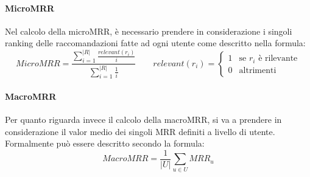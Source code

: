 \paragraph{MicroMRR}
Nel calcolo della microMRR, è necessario prendere in considerazione i singoli ranking delle raccomandazioni fatte ad ogni utente come descritto nella formula:
\begin{equation*}
MicroMRR =\frac{\sum\limits_{i=1}^{|R|}{\frac{relevant(r_i)}{i}}}{\sum\limits_{i=1}^{|R|}{\frac{1}{i}}} \qquad relevant(r_i)=\begin{cases} 1 & \mbox{se }r_i\mbox{ è rilevante} \\ 0 & \mbox{altrimenti}
\end{cases}
\end{equation*}
\paragraph{MacroMRR}
Per quanto riguarda invece il calcolo della macroMRR, si va a prendere in considerazione il valor medio dei singoli MRR definiti a livello di utente. Formalmente può essere descritto secondo la formula:
\begin{equation*}
MacroMRR =\frac{1}{|U|}\sum_{u\in U}{MRR_u}
\end{equation*}


